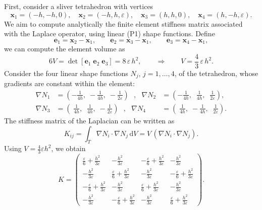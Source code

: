 \documentclass{article}
\begin{document}
First, consider a sliver tetrahedron with vertices
\[
\bm{x}_1=(-h,-h,0), \quad
\bm{x}_2=(-h,h,\varepsilon), \quad
\bm{x}_3=(h,h,0), \quad
\bm{x}_4=(h,-h,\varepsilon).
\]
We aim to compute analytically the finite element stiffness matrix
associated with the Laplace operator, using linear (P1) shape functions. Define
\[
\bm{e}_1=\bm{x}_2-\bm{x}_1,\qquad
\bm{e}_2=\bm{x}_3-\bm{x}_1,\qquad
\bm{e}_3=\bm{x}_4-\bm{x}_1,
\]
we can compute the element volume as
\[
6V = \det[\bm{e}_1\;\bm{e}_2\;\bm{e}_3]
     = 8\,\varepsilon\,h^2,
\qquad\Rightarrow\qquad
V = \frac{4}{3}\,\varepsilon\,h^2.
\]
Consider the four linear
shape functions $N_j$, $j=1,\dots,4$, of the tetrahedron, whose gradients are constant
within the element:
\[
\begin{aligned}
\nabla N_1 &= \left(-\tfrac{1}{4h},\;-\tfrac{1}{4h},\;-\tfrac{1}{2\varepsilon}\right)~~~,~~~
\nabla N_2 &= \left(-\tfrac{1}{4h},\;\;\tfrac{1}{4h},\;\;\tfrac{1}{2\varepsilon}\right),\\
\nabla N_3 &= \left(\;\tfrac{1}{4h},\;\;\tfrac{1}{4h},\;-\tfrac{1}{2\varepsilon}\right)~~~,~~~
\nabla N_4 &= \left(\;\tfrac{1}{4h},\;-\tfrac{1}{4h},\;\;\tfrac{1}{2\varepsilon}\right).
\end{aligned}
\]
The stiffness matrix of the Laplacian can be written as
\[
K_{ij} = \int_T \nabla N_i \cdot \nabla N_j \,\mathrm{d}V
        = V\,(\nabla N_i \cdot \nabla N_j).
\]
Using $V=\tfrac{4}{3}\varepsilon h^2$, we obtain
\[
K=
\begin{pmatrix}
\frac{\varepsilon}{6}+\frac{h^2}{3\varepsilon} & -\frac{h^2}{3\varepsilon} & -\frac{\varepsilon}{6}+\frac{h^2}{3\varepsilon} & -\frac{h^2}{3\varepsilon} \\[0.3em]
-\frac{h^2}{3\varepsilon} & \frac{\varepsilon}{6}+\frac{h^2}{3\varepsilon} & -\frac{h^2}{3\varepsilon} & -\frac{\varepsilon}{6}+\frac{h^2}{3\varepsilon} \\[0.3em]
-\frac{\varepsilon}{6}+\frac{h^2}{3\varepsilon} & -\frac{h^2}{3\varepsilon} & \frac{\varepsilon}{6}+\frac{h^2}{3\varepsilon} & -\frac{h^2}{3\varepsilon} \\[0.3em]
-\frac{h^2}{3\varepsilon} & -\frac{\varepsilon}{6}+\frac{h^2}{3\varepsilon} & -\frac{h^2}{3\varepsilon} & \frac{\varepsilon}{6}+\frac{h^2}{3\varepsilon}
\end{pmatrix}.
\]
\end{document}
